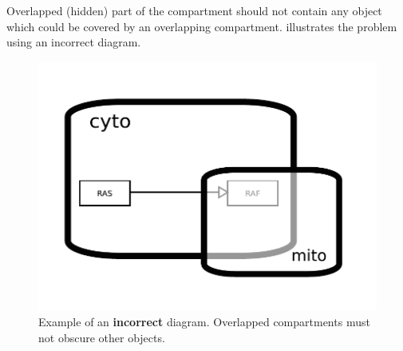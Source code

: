 Overlapped (hidden) part of the compartment should not contain any object which could be covered by an overlapping compartment.   illustrates the problem using an incorrect diagram.

\begin{figure}[H]
  \centering
  \includegraphics[scale = 0.45]{images/build/compartment_overlapping_wrong.pdf}
  \caption{Example of an \textbf{incorrect} diagram.  Overlapped compartments must not obscure other objects.}
  \label{fig:overlap-bad}
\end{figure}

